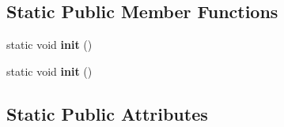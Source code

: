 \subsection*{Static Public Member Functions}
\begin{DoxyCompactItemize}
\item 
\hypertarget{class_command_base_a4dbfcd3b6ae92d752bc36a29dd1e1a5a}{}static void {\bfseries init} ()\label{class_command_base_a4dbfcd3b6ae92d752bc36a29dd1e1a5a}

\item 
\hypertarget{class_command_base_a3cfbba0456cf0c8278521bb2ca93e1aa}{}static void {\bfseries init} ()\label{class_command_base_a3cfbba0456cf0c8278521bb2ca93e1aa}

\end{DoxyCompactItemize}
\subsection*{Static Public Attributes}
